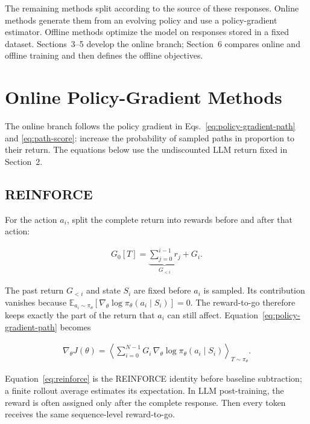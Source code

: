 \documentclass[11pt]{article}
\newcommand{\E}{\mathbb{E}}
\begin{document}
The remaining methods split according to the source of these responses.
Online methods generate them from an evolving policy and use a policy-gradient
estimator.  Offline methods optimize the model on responses stored in a fixed
dataset.
Sections~3--5 develop the online branch; Section~6 compares online and
offline training and then defines the offline objectives.

\newpage
\section{Online Policy-Gradient Methods}

The online branch follows the policy gradient in
Eqs.~\eqref{eq:policy-gradient-path} and \eqref{eq:path-score}: increase the
probability of sampled paths in proportion to their return.  The equations
below use the undiscounted LLM return fixed in Section~2.

\subsection{REINFORCE}

For the action \(a_i\), split the complete return into rewards before and
after that action:

\begin{equation}
    \begin{split}
        G_0[T]
        =\underbrace{\sum_{j=0}^{i-1}r_j}_{G_{<i}}+G_i.
    \end{split}
\end{equation}

The past return \(G_{<i}\) and state \(S_i\) are fixed before \(a_i\) is
sampled.  Its contribution vanishes because
\(\E_{a_i\sim\pi_\theta}[\nabla_\theta\log\pi_\theta(a_i\mid S_i)]=0\).
The reward-to-go therefore keeps exactly the part of the return that \(a_i\)
can still affect.  Equation~\eqref{eq:policy-gradient-path} becomes

\begin{equation}
    \begin{split}
    \nabla_\theta J(\theta)
      =\left\langle
       \sum_{i=0}^{N-1}
       G_i\,
       \nabla_\theta\log\pi_\theta(a_i\mid S_i)
       \right\rangle_{T\sim\pi_\theta}.
    \end{split}
    \label{eq:reinforce}
\end{equation}

Equation~\eqref{eq:reinforce} is the REINFORCE identity before baseline
subtraction; a finite rollout average estimates its expectation.  In LLM
post-training, the reward is often assigned only after the complete response.
Then every token receives the same sequence-level reward-to-go.
\end{document}
